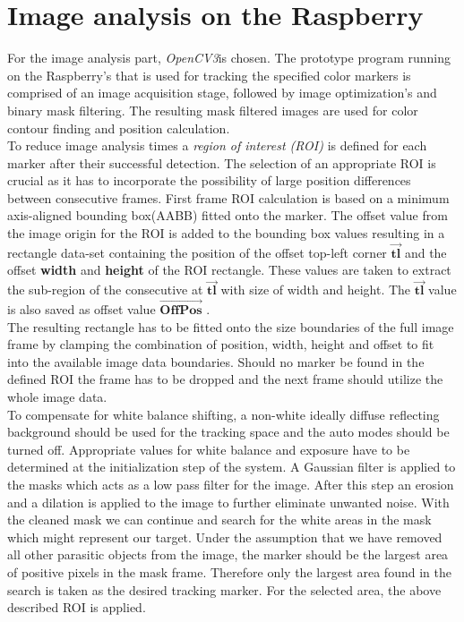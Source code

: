 \section{Image analysis on the Raspberry}
For the image analysis part, \textit{OpenCV3}is chosen. 
The prototype program running on the Raspberry's that is used for tracking the specified color markers is comprised of an image acquisition stage, followed by image optimization's and  binary mask filtering. The resulting mask filtered images are used for color contour finding and position calculation.\\
To reduce image analysis times a \textit{region of interest (ROI)} is defined for each marker after their successful detection. The selection of an appropriate ROI is crucial as it has to incorporate the possibility of large position differences between consecutive frames.
First frame ROI calculation is based on a minimum axis-aligned bounding box(AABB) fitted onto the marker. The offset value from the image origin for the ROI is added to the bounding box values resulting in a rectangle data-set containing the position of the offset top-left corner $\vec{\mathbf{tl}}$ and the offset \textbf{width} and \textbf{height} of the ROI rectangle.
These values are taken to extract the sub-region of the consecutive at $\vec{\mathbf{tl}}$ with size of width and height. The $\vec{\mathbf{tl}}$ value is also saved as offset value $\vec{\mathbf{OffPos}}$ .\\The resulting rectangle has to be fitted onto the size boundaries of the full image frame by clamping the combination of position, width, height and offset to fit into the available image data boundaries.
Should no marker be found in the defined ROI the frame has to be dropped and the next frame should utilize the whole image data.\\
To compensate for white balance shifting, a non-white ideally diffuse reflecting background should be used for the tracking space and the auto modes should be turned off. Appropriate values for white balance and exposure have to be determined at the initialization step of the system. A Gaussian filter is applied to the masks which acts as a low pass filter for the image. After this step an erosion and a dilation\cite[chapter~3.11-12]{Davies.2017} is applied to the image to further eliminate unwanted noise.
With the cleaned mask we can continue and search for the white areas in the mask which might represent our target. Under the assumption that we have removed all other parasitic objects from the image, the marker should be the largest area of positive pixels in the mask frame. Therefore only the largest area found in the search is taken as the desired tracking marker. For the selected area, the above described ROI is applied.
